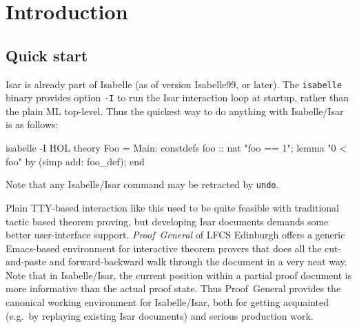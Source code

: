 
\chapter{Introduction}

\section{Quick start}

Isar is already part of Isabelle (as of version Isabelle99, or later).  The
\texttt{isabelle} binary provides option \texttt{-I} to run the Isar
interaction loop at startup, rather than the plain ML top-level.  Thus the
quickest way to do anything with Isabelle/Isar is as follows:
\begin{ttbox}
isabelle -I HOL\medskip
{}\medskip
theory Foo = Main:
constdefs foo :: nat  "foo == 1";
lemma "0 < foo" by (simp add: foo_def);
end
\end{ttbox}
Note that any Isabelle/Isar command may be retracted by \texttt{undo}.

Plain TTY-based interaction like this used to be quite feasible with
traditional tactic based theorem proving, but developing Isar documents
demands some better user-interface support.  \emph{Proof~General} of LFCS Edinburgh \cite{proofgeneral} offers a generic Emacs-based
environment for interactive theorem provers that does all the cut-and-paste
and forward-backward walk through the document in a very neat way.  Note that
in Isabelle/Isar, the current position within a partial proof document is more
informative than the actual proof state.  Thus Proof~General provides the
canonical working environment for Isabelle/Isar, both for getting acquainted
(e.g.\ by replaying existing Isar documents) and serious production work.

\medskip

